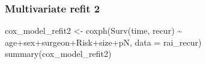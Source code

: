 \documentclass[
  letterpaper,
  DIV=11,
  numbers=noendperiod]{scrartcl}
\newenvironment{Shaded}{\begin{snugshade}}{\end{snugshade}}
\newcommand{\AttributeTok}[1]{\textcolor[rgb]{0.40,0.45,0.13}{#1}}
\newcommand{\FunctionTok}[1]{\textcolor[rgb]{0.28,0.35,0.67}{#1}}
\newcommand{\NormalTok}[1]{\textcolor[rgb]{0.00,0.23,0.31}{#1}}
\newcommand{\OtherTok}[1]{\textcolor[rgb]{0.00,0.23,0.31}{#1}}
\newcommand{\SpecialCharTok}[1]{\textcolor[rgb]{0.37,0.37,0.37}{#1}}
\begin{document}
\subsubsection{Multivariate refit 2}\label{multivariate-refit-2}

\begin{Shaded}
\begin{Highlighting}[]
\NormalTok{cox\_model\_refit2 }\OtherTok{\textless{}{-}} \FunctionTok{coxph}\NormalTok{(}\FunctionTok{Surv}\NormalTok{(time, recur) }\SpecialCharTok{\textasciitilde{}}\NormalTok{ age}\SpecialCharTok{+}\NormalTok{sex}\SpecialCharTok{+}\NormalTok{surgeon}\SpecialCharTok{+}\NormalTok{Risk}\SpecialCharTok{+}\NormalTok{size}\SpecialCharTok{+}\NormalTok{pN, }\AttributeTok{data =}\NormalTok{ rai\_recur)}
\FunctionTok{summary}\NormalTok{(cox\_model\_refit2)}
\end{Highlighting}
\end{Shaded}
\end{document}
